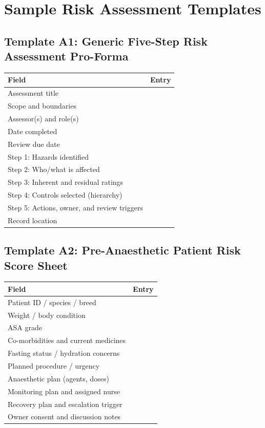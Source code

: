 \chapter{Sample Risk Assessment Templates}
\label{app:Sample Risk Assessment Templates}

\section{Template A1: Generic Five-Step Risk Assessment Pro-Forma}
\begin{tabularx}{\textwidth}{>{\raggedright\arraybackslash}p{4.3cm}X}
\toprule
Field & Entry \\
\midrule
Assessment title & \\
Scope and boundaries & \\
Assessor(s) and role(s) & \\
Date completed & \\
Review due date & \\
Step 1: Hazards identified & \\
Step 2: Who/what is affected & \\
Step 3: Inherent and residual ratings & \\
Step 4: Controls selected (hierarchy) & \\
Step 5: Actions, owner, and review triggers & \\
Record location & \\
\bottomrule
\end{tabularx}

\section{Template A2: Pre-Anaesthetic Patient Risk Score Sheet}
\begin{tabularx}{\textwidth}{>{\raggedright\arraybackslash}p{4.3cm}X}
\toprule
Field & Entry \\
\midrule
Patient ID / species / breed & \\
Weight / body condition & \\
ASA grade & \\
Co-morbidities and current medicines & \\
Fasting status / hydration concerns & \\
Planned procedure / urgency & \\
Anaesthetic plan (agents, doses) & \\
Monitoring plan and assigned nurse & \\
Recovery plan and escalation trigger & \\
Owner consent and discussion notes & \\
\bottomrule
\end{tabularx}


